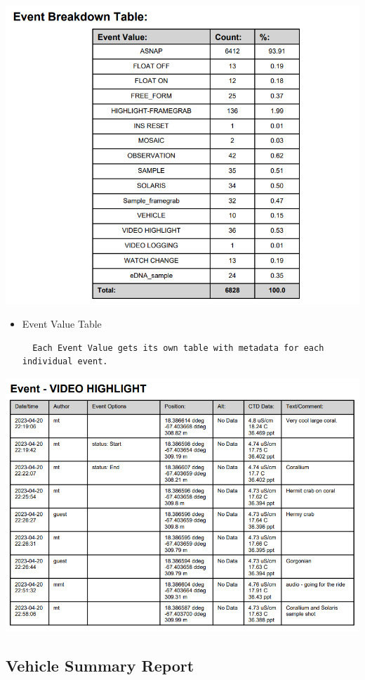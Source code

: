 \documentclass[
  letterpaper,
  DIV=11,
  numbers=noendperiod]{scrreprt}
\begin{document}
\includegraphics{images/image31.png}

\begin{itemize}
\item
  Event Value Table

\begin{verbatim}
  Each Event Value gets its own table with metadata for each individual event. 
\end{verbatim}
\end{itemize}

\includegraphics{images/image27.png}

\hypertarget{vehicle-summary-report}{%
\subsection{Vehicle Summary Report}\label{vehicle-summary-report}}
\end{document}
